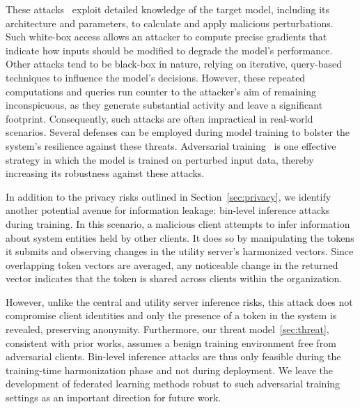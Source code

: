 These attacks~\cite{chakraborty2021survey} exploit detailed knowledge of the target model, including its architecture and parameters, to calculate and apply malicious perturbations. Such white-box access allows an attacker to compute precise gradients that indicate how inputs should be modified to degrade the model’s performance. Other attacks tend to be black-box in nature, relying on iterative, query-based techniques to influence the model’s decisions. However, these repeated computations and queries run counter to the attacker’s aim of remaining inconspicuous, as they generate substantial activity and leave a significant footprint. Consequently, such attacks are often impractical in real-world scenarios. Several defenses can be employed during model training to bolster the system’s resilience against these threats. Adversarial training~\cite{tramer2019adversarial} is one effective strategy in which the model is trained on perturbed input data, thereby increasing its robustness against these attacks.

In addition to the privacy risks outlined in Section~\ref{sec:privacy}, we identify another potential avenue for information leakage: bin-level inference attacks during training. In this scenario, a malicious client attempts to infer information about system entities held by other clients. It does so by manipulating the tokens it submits and observing changes in the utility server's harmonized vectors. Since overlapping token vectors are averaged, any noticeable change in the returned vector indicates that the token is shared across clients within the organization.  

However, unlike the central and utility server inference risks, this attack does not compromise client identities and only the presence of a token in the system is revealed, preserving anonymity. Furthermore, our threat model~\ref{sec:threat}, consistent with prior \pids works, assumes a benign training environment free from adversarial clients. Bin-level inference attacks are thus only feasible during the training-time harmonization phase and not during deployment. We leave the development of federated learning methods robust to such adversarial training settings as an important direction for future work.
